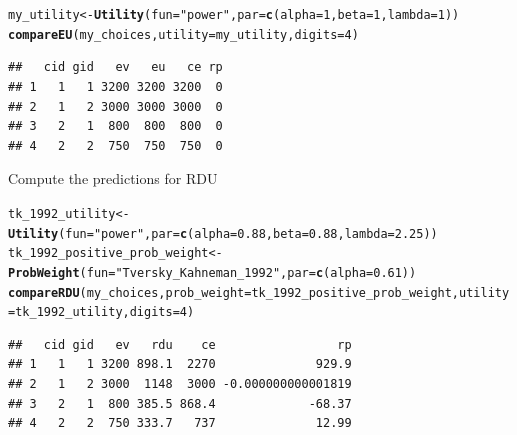 \documentclass{article}\usepackage[]{graphicx}\usepackage[]{color}
\makeatletter
\newcommand{\hlnum}[1]{\textcolor[rgb]{0.686,0.059,0.569}{#1}}%
\newcommand{\hlstr}[1]{\textcolor[rgb]{0.192,0.494,0.8}{#1}}%
\newcommand{\hlstd}[1]{\textcolor[rgb]{0.345,0.345,0.345}{#1}}%
\newcommand{\hlkwb}[1]{\textcolor[rgb]{0.69,0.353,0.396}{#1}}%
\newcommand{\hlkwc}[1]{\textcolor[rgb]{0.333,0.667,0.333}{#1}}%
\newcommand{\hlkwd}[1]{\textcolor[rgb]{0.737,0.353,0.396}{\textbf{#1}}}%
\newenvironment{kframe}{%
 \def\at@end@of@kframe{}%
 \ifinner\ifhmode%
  \def\at@end@of@kframe{\end{minipage}}%
  \begin{minipage}{\columnwidth}%
 \fi\fi%
 \def\FrameCommand##1{\hskip\@totalleftmargin \hskip-\fboxsep
 \colorbox{shadecolor}{##1}\hskip-\fboxsep
     \hskip-\linewidth \hskip-\@totalleftmargin \hskip\columnwidth}%
 \MakeFramed {\advance\hsize-\width
   \@totalleftmargin\z@ \linewidth\hsize
   \@setminipage}}%
 {\par\unskip\endMakeFramed%
 \at@end@of@kframe}
\newenvironment{knitrout}{}{} %
\makeatother
\begin{document}
\begin{knitrout}
\color{fgcolor}\begin{kframe}
\begin{alltt}
\hlstd{my_utility} \hlkwb{<-} \hlkwd{Utility}\hlstd{(}\hlkwc{fun}\hlstd{=}\hlstr{"power"}\hlstd{,} \hlkwc{par}\hlstd{=}\hlkwd{c}\hlstd{(}\hlkwc{alpha}\hlstd{=}\hlnum{1}\hlstd{,} \hlkwc{beta}\hlstd{=}\hlnum{1}\hlstd{,} \hlkwc{lambda}\hlstd{=}\hlnum{1}\hlstd{))}
\hlkwd{compareEU}\hlstd{(my_choices,} \hlkwc{utility}\hlstd{=my_utility,} \hlkwc{digits}\hlstd{=}\hlnum{4}\hlstd{)}
\end{alltt}
\begin{verbatim}
##   cid gid   ev   eu   ce rp
## 1   1   1 3200 3200 3200  0
## 2   1   2 3000 3000 3000  0
## 3   2   1  800  800  800  0
## 4   2   2  750  750  750  0
\end{verbatim}
\end{kframe}
\end{knitrout}


Compute the predictions for RDU

\begin{knitrout}
\color{fgcolor}\begin{kframe}
\begin{alltt}
\hlstd{tk_1992_utility} \hlkwb{<-} \hlkwd{Utility}\hlstd{(}\hlkwc{fun}\hlstd{=}\hlstr{"power"}\hlstd{,} \hlkwc{par}\hlstd{=}\hlkwd{c}\hlstd{(}\hlkwc{alpha}\hlstd{=}\hlnum{0.88}\hlstd{,} \hlkwc{beta}\hlstd{=}\hlnum{0.88}\hlstd{,} \hlkwc{lambda}\hlstd{=}\hlnum{2.25}\hlstd{))}
\hlstd{tk_1992_positive_prob_weight} \hlkwb{<-} \hlkwd{ProbWeight}\hlstd{(}\hlkwc{fun}\hlstd{=}\hlstr{"Tversky_Kahneman_1992"}\hlstd{,} \hlkwc{par}\hlstd{=}\hlkwd{c}\hlstd{(}\hlkwc{alpha}\hlstd{=}\hlnum{0.61}\hlstd{))}
\hlkwd{compareRDU}\hlstd{(my_choices,} \hlkwc{prob_weight}\hlstd{=tk_1992_positive_prob_weight,} \hlkwc{utility}\hlstd{=tk_1992_utility,} \hlkwc{digits}\hlstd{=}\hlnum{4}\hlstd{)}
\end{alltt}
\begin{verbatim}
##   cid gid   ev   rdu    ce                 rp
## 1   1   1 3200 898.1  2270              929.9
## 2   1   2 3000  1148  3000 -0.000000000001819
## 3   2   1  800 385.5 868.4             -68.37
## 4   2   2  750 333.7   737              12.99
\end{verbatim}
\end{kframe}
\end{knitrout}
\end{document}
